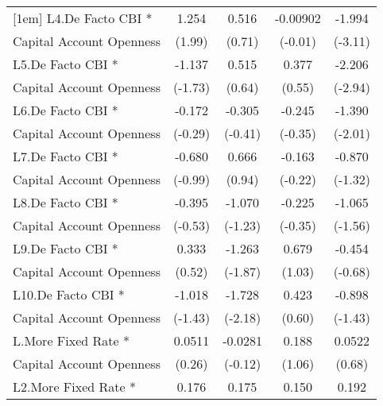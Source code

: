 {\begin{tabular}{l*{4}{c}}
[1em]
L4.De Facto CBI *   &       1.254\sym{*}  &       0.516         &    -0.00902         &      -1.994\sym{**} \\
Capital Account Openness&      (1.99)         &      (0.71)         &     (-0.01)         &     (-3.11)         \\
[1em]
L5.De Facto CBI *   &      -1.137         &       0.515         &       0.377         &      -2.206\sym{**} \\
Capital Account Openness&     (-1.73)         &      (0.64)         &      (0.55)         &     (-2.94)         \\
[1em]
L6.De Facto CBI *   &      -0.172         &      -0.305         &      -0.245         &      -1.390\sym{*}  \\
Capital Account Openness&     (-0.29)         &     (-0.41)         &     (-0.35)         &     (-2.01)         \\
[1em]
L7.De Facto CBI *   &      -0.680         &       0.666         &      -0.163         &      -0.870         \\
Capital Account Openness&     (-0.99)         &      (0.94)         &     (-0.22)         &     (-1.32)         \\
[1em]
L8.De Facto CBI *   &      -0.395         &      -1.070         &      -0.225         &      -1.065         \\
Capital Account Openness&     (-0.53)         &     (-1.23)         &     (-0.35)         &     (-1.56)         \\
[1em]
L9.De Facto CBI *   &       0.333         &      -1.263         &       0.679         &      -0.454         \\
Capital Account Openness&      (0.52)         &     (-1.87)         &      (1.03)         &     (-0.68)         \\
[1em]
L10.De Facto CBI *  &      -1.018         &      -1.728\sym{*}  &       0.423         &      -0.898         \\
Capital Account Openness&     (-1.43)         &     (-2.18)         &      (0.60)         &     (-1.43)         \\
[1em]
L.More Fixed Rate * &      0.0511         &     -0.0281         &       0.188         &      0.0522         \\
Capital Account Openness&      (0.26)         &     (-0.12)         &      (1.06)         &      (0.68)         \\
[1em]
L2.More Fixed Rate *&       0.176         &       0.175         &       0.150         &       0.192\sym{*}  \\

\end{tabular}}

